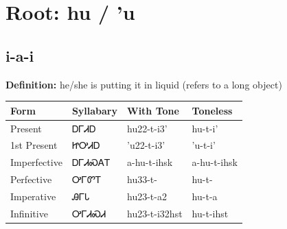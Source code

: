 \documentclass{article}%
\begin{document}
%
\normalsize%
\section*{Root: hu / 'u}%
\subsection*{i-a-i}%
\textbf{Definition: }%
he/she is putting it in liquid (refers to a long object)%
\\[0.5em]%
\begin{tabular}{|l|l|l|l|}%
\hline%
\textbf{Form}&\textbf{Syllabary}&\textbf{With Tone}&\textbf{Toneless}\\%
\hline%
Present&ᎠᎱᏗᎠ&hu22{-}t{-}i3'&hu{-}t{-}i'\\%
1st Present&ᏥᎤᏗᎠ&'u22{-}t{-}i3'&'u{-}t{-}i'\\%
Imperfective&ᎠᎱᏗᏍᎪᎢ&a{-}hu{-}t{-}ihsk&a{-}hu{-}t{-}ihsk\\%
Perfective&ᎤᎱᏛᎢ&hu33{-}t{-}&hu{-}t{-}\\%
Imperative&ᎯᎱᏓ&hu23{-}t{-}a2&hu{-}t{-}a\\%
Infinitive&ᎤᎱᏗᏍᏗ&hu23{-}t{-}i32hst&hu{-}t{-}ihst\\%
\hline%
\end{tabular}%
\\[1em]%
\end{document}
